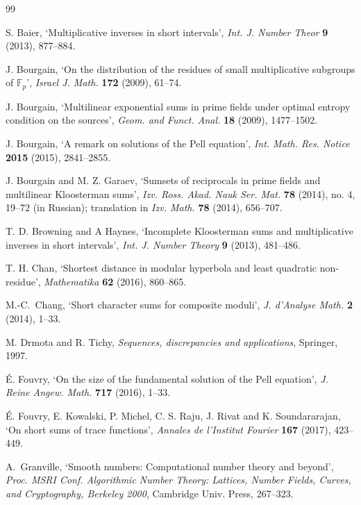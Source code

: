 \documentclass[12pt]{amsart}
\numberwithin{equation}{section}
\numberwithin{theorem}{section}
\numberwithin{table}{section}
\numberwithin{figure}{section}
\def \F{\mathbb{F}}
\begin{document}
\begin{thebibliography}{99}

  S.  Baier, `Multiplicative inverses in short intervals',  
  {\it  Int. J. Number Theor\/} {\bf 9} (2013),  877--884.  
  
   J. Bourgain, `On the distribution of the residues
of small multiplicative subgroups of $\F_p$', 
 {\it Israel J. Math.\/} {\bf 172} (2009), 61--74.
 
  J. Bourgain, 
`Multilinear exponential sums in prime
fields under optimal entropy condition on
the sources', {\it  Geom. and Funct. Anal.\/} 
{\bf 18} (2009), 1477--1502.

  J. Bourgain, 
`A remark on solutions of the Pell equation', {\it  Int. Math. Res. Notice\/} {\bf 2015} (2015), 2841--2855.

 J. Bourgain and M. Z. Garaev, `Sumsets of reciprocals in prime fields and multilinear
Kloosterman sums', {\it Izv. Ross. Akad. Nauk Ser. Mat.\/} {\bf 78} (2014), no. 4, 19--72  (in Russian);
translation in {\it Izv. Math.\/} {\bf 78} (2014),  656--707.

  T. D. Browning and A Haynes, 
 `Incomplete Kloosterman sums and multiplicative inverses in short intervals',  
  {\it Int. J. Number Theory\/} {\bf  9} (2013),  481--486. 


  T. H. Chan,  `Shortest distance in modular hyperbola and least quadratic non-residue',  
  {\it Mathematika\/} {\bf  62} (2016),  860--865. 
  
   M.-C.~Chang,
`Short character sums for composite moduli',  
  {\it J. d'Analyse Math.\/} {\bf  2} (2014), 1--33.
  
 M. Drmota and R. Tichy, 
{\it Sequences, discrepancies and applications\/},
Springer,  1997.

 {\'E}. Fouvry,    `On the size of the fundamental solution of the Pell equation',
 {\it J. Reine Angew. Math.\/}  {\bf 717} (2016), 1--33.

 {\'E}. Fouvry,  E. Kowalski,
  P.  Michel,  C. S. Raju, J. Rivat and  K. Soundararajan,
 `On short sums of trace functions',
 {\it Annales de l'Institut Fourier\/}  {\bf 167}  (2017),  423--449.

A.~Granville, `Smooth numbers: Computational number theory and
beyond', {\it Proc. MSRI Conf. Algorithmic Number Theory:
Lattices, Number Fields, Curves, and Cryptography, Berkeley
2000}, Cambridge Univ. Press,  267--323. 


\end{thebibliography}
\end{document}
